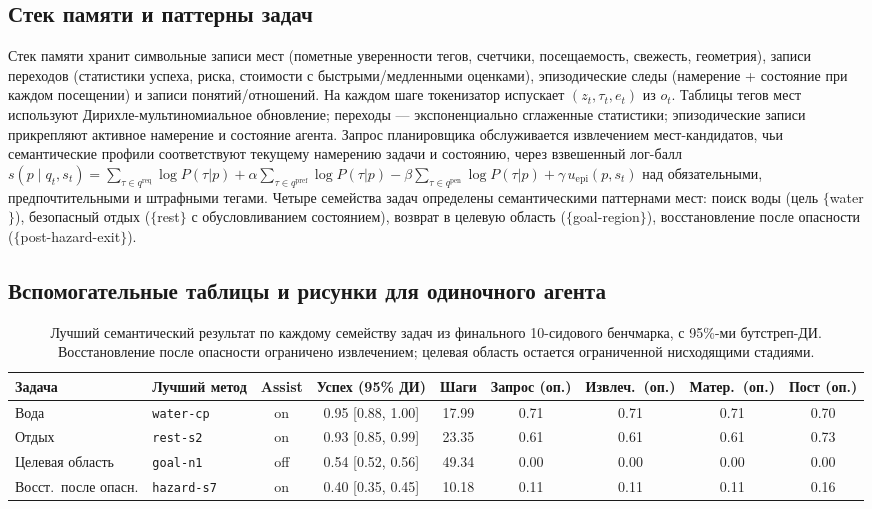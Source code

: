 \documentclass{article}
\newcommand{\method}[1]{\texttt{#1}}
\begin{document}
\subsection{Стек памяти и паттерны задач}

Стек памяти хранит символьные записи мест (пометные уверенности тегов, счетчики, посещаемость, свежесть, геометрия), записи переходов (статистики успеха, риска, стоимости с быстрыми/медленными оценками), эпизодические следы (намерение + состояние при каждом посещении) и записи понятий/отношений. На каждом шаге токенизатор испускает $(z_t, \tau_t, e_t)$ из $o_t$. Таблицы тегов мест используют Дирихле-мультиномиальное обновление; переходы --- экспоненциально сглаженные статистики; эпизодические записи прикрепляют активное намерение и состояние агента. Запрос планировщика обслуживается извлечением мест-кандидатов, чьи семантические профили соответствуют текущему намерению задачи и состоянию, через взвешенный лог-балл
$s(p \mid q_t, s_t) = \sum_{\tau \in q^{\mathrm{req}}} \log P(\tau|p)
+ \alpha \sum_{\tau \in q^{\mathrm{pref}}} \log P(\tau|p)
- \beta \sum_{\tau \in q^{\mathrm{pen}}} \log P(\tau|p)
+ \gamma\, u_{\mathrm{epi}}(p, s_t)$
над обязательными, предпочтительными и штрафными тегами. Четыре семейства задач определены семантическими паттернами мест: поиск воды (цель $\{$water$\}$), безопасный отдых ($\{$rest$\}$ с обусловливанием состоянием), возврат в целевую область ($\{$goal-region$\}$), восстановление после опасности ($\{$post-hazard-exit$\}$).

\subsection{Вспомогательные таблицы и рисунки для одиночного агента}
\label{app:single-results-table}

\begin{table}[!ht]
  \caption{Лучший семантический результат по каждому семейству задач из финального 10-сидового бенчмарка, с 95\%-ми бутстреп-ДИ. Восстановление после опасности ограничено извлечением; целевая область остается ограниченной нисходящими стадиями.}
  \label{tab:main-results}
  \centering
  \scriptsize
  \setlength{\tabcolsep}{3.5pt}
  \begin{tabular}{p{1.5cm}p{1.7cm}c c c c c c c}
    \toprule
    Задача & Лучший метод & Assist & Успех (95\% ДИ) & Шаги & Запрос (оп.) & Извлеч.\ (оп.) & Матер.\ (оп.) & Пост (оп.) \\
    \midrule
    Вода & \method{water-cp} & on & 0.95 [0.88, 1.00] & 17.99 & 0.71 & 0.71 & 0.71 & 0.70 \\
    Отдых & \method{rest-s2} & on & 0.93 [0.85, 0.99] & 23.35 & 0.61 & 0.61 & 0.61 & 0.73 \\
    Целевая область & \method{goal-n1} & off & 0.54 [0.52, 0.56] & 49.34 & 0.00 & 0.00 & 0.00 & 0.00 \\
    Восст.\ после опасн. & \method{hazard-s7} & on & 0.40 [0.35, 0.45] & 10.18 & 0.11 & 0.11 & 0.11 & 0.16 \\
    \bottomrule
  \end{tabular}
\end{table}
\end{document}
